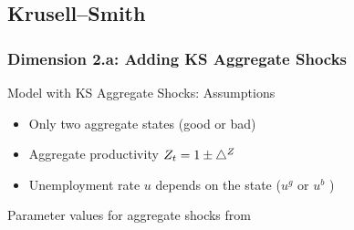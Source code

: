 \subsection{Krusell--Smith}
\begin{frame}
\frametitle{{Dimension 2.a: Adding KS Aggregate Shocks}}
\begin{footnotesize}
\begin{block}{Model with KS Aggregate Shocks: Assumptions}
\begin{itemize}
  \item Only two aggregate states (good or bad)
  \item Aggregate productivity $Z_{t}=1\pm\bigtriangleup ^{Z}$
  \item Unemployment rate $u$ depends on the state ($u^{g}$ or $u^{b}$ )
\end{itemize}

Parameter values for aggregate shocks from 
\begin{table}
\label{table:ParamsAggShocks}
\begin{minipage}{\textwidth}

\end{minipage}
\end{table}
\end{block}
\end{footnotesize}
\end{frame}


